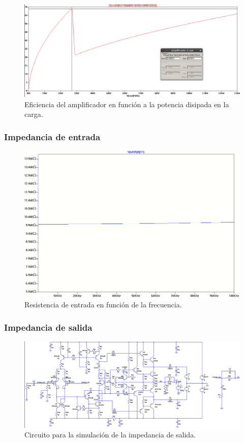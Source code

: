 \begin{figure}[H]
\centering
\includegraphics[width=1\textwidth]{img/eficiencia.png}
\caption{Eficiencia del amplificador en función a la potencia disipada en la carga.}
\label{simul_efi}
\end{figure}

\subsubsection{Impedancia de entrada}

\begin{figure}[H]
\centering
\includegraphics[width=1\textwidth]{img/Rin.png}
\caption{Resistencia de entrada en función de la frecuencia.}
\label{Rin_sim}
\end{figure}

\subsubsection{Impedancia de salida}

\begin{figure}[H]
\centering
\includegraphics[width=1\textwidth]{img/Rout_circ_1.png}
\caption{Circuito para la simulación de la impedancia de salida.}
\label{Rout_sim_circ}
\end{figure}

